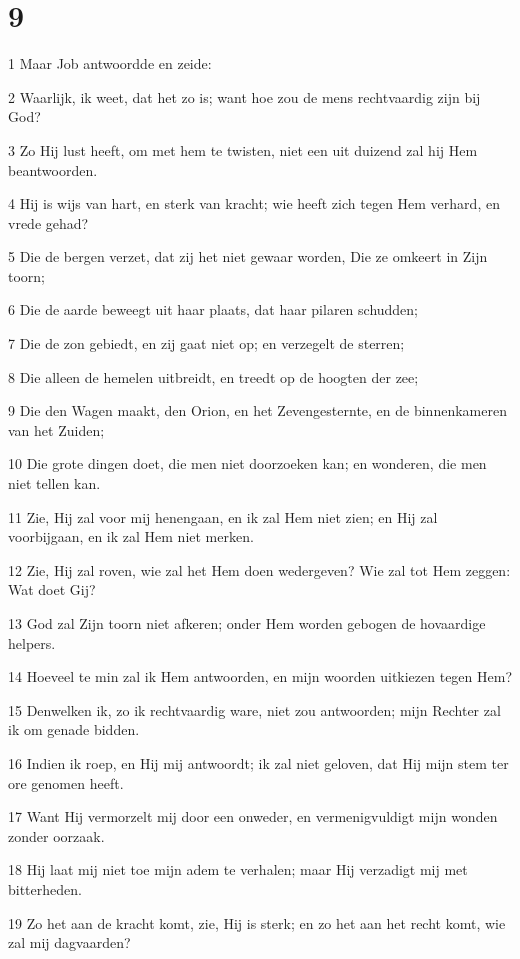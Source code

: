\chapter{9}

\par 1 Maar Job antwoordde en zeide:
\par 2 Waarlijk, ik weet, dat het zo is; want hoe zou de mens rechtvaardig zijn bij God?
\par 3 Zo Hij lust heeft, om met hem te twisten, niet een uit duizend zal hij Hem beantwoorden.
\par 4 Hij is wijs van hart, en sterk van kracht; wie heeft zich tegen Hem verhard, en vrede gehad?
\par 5 Die de bergen verzet, dat zij het niet gewaar worden, Die ze omkeert in Zijn toorn;
\par 6 Die de aarde beweegt uit haar plaats, dat haar pilaren schudden;
\par 7 Die de zon gebiedt, en zij gaat niet op; en verzegelt de sterren;
\par 8 Die alleen de hemelen uitbreidt, en treedt op de hoogten der zee;
\par 9 Die den Wagen maakt, den Orion, en het Zevengesternte, en de binnenkameren van het Zuiden;
\par 10 Die grote dingen doet, die men niet doorzoeken kan; en wonderen, die men niet tellen kan.
\par 11 Zie, Hij zal voor mij henengaan, en ik zal Hem niet zien; en Hij zal voorbijgaan, en ik zal Hem niet merken.
\par 12 Zie, Hij zal roven, wie zal het Hem doen wedergeven? Wie zal tot Hem zeggen: Wat doet Gij?
\par 13 God zal Zijn toorn niet afkeren; onder Hem worden gebogen de hovaardige helpers.
\par 14 Hoeveel te min zal ik Hem antwoorden, en mijn woorden uitkiezen tegen Hem?
\par 15 Denwelken ik, zo ik rechtvaardig ware, niet zou antwoorden; mijn Rechter zal ik om genade bidden.
\par 16 Indien ik roep, en Hij mij antwoordt; ik zal niet geloven, dat Hij mijn stem ter ore genomen heeft.
\par 17 Want Hij vermorzelt mij door een onweder, en vermenigvuldigt mijn wonden zonder oorzaak.
\par 18 Hij laat mij niet toe mijn adem te verhalen; maar Hij verzadigt mij met bitterheden.
\par 19 Zo het aan de kracht komt, zie, Hij is sterk; en zo het aan het recht komt, wie zal mij dagvaarden?
